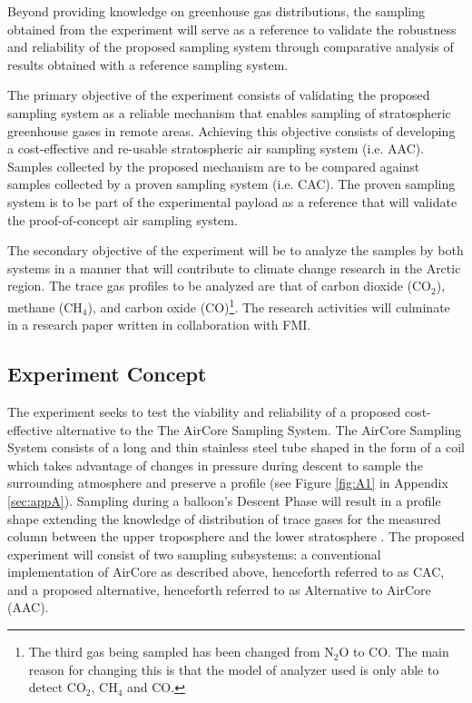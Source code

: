 \documentclass[a4paper,12pt,twoside]{article}
\begin{document}
Beyond providing knowledge on greenhouse gas distributions, the sampling obtained from the experiment will serve as a reference to validate the robustness and reliability of the proposed sampling system through comparative analysis of results obtained with a reference sampling system.

The primary objective of the experiment consists of validating the proposed sampling system as a reliable mechanism that enables sampling of stratospheric greenhouse gases in remote areas. Achieving this objective consists of developing a cost-effective and re-usable stratospheric air sampling system (i.e. AAC). Samples collected by the proposed mechanism are to be compared against samples collected by a proven sampling system (i.e. CAC). The proven sampling system is to be part of the experimental payload as a reference that will validate the proof-of-concept air sampling system.

The secondary objective of the experiment will be to analyze the samples by both systems in a manner that will contribute to climate change research in the Arctic region. The trace gas profiles to be analyzed are that of carbon dioxide (CO$_{2}$), methane (CH$_{4}$), and carbon oxide (CO)\footnote{The third gas being sampled has been changed from N$_{2}$O to CO. The main reason for changing this is that the model of analyzer used is only able to detect CO$_{2}$, CH$_{4}$ and CO.\label{fn:ChangeN2OtoCO}}. The research activities will culminate in a research paper written in collaboration with FMI.


\subsection{Experiment Concept}

The experiment seeks to test the viability and reliability of a proposed cost-effective alternative to the The AirCore Sampling System. The AirCore Sampling System consists of a long and thin stainless steel tube shaped in the form of a coil which takes advantage of changes in pressure during descent to sample the surrounding atmosphere and preserve a profile (see Figure \ref{fig:A1} in Appendix \ref{sec:appA}). Sampling during a balloon’s Descent Phase will result in a profile shape extending the knowledge of distribution of trace gases for the measured column between the upper troposphere and the lower stratosphere \cite{Karion}. The proposed experiment will consist of two sampling subsystems: a conventional implementation of AirCore as described above, henceforth referred to as CAC, and a proposed alternative, henceforth referred to as Alternative to AirCore (AAC).
\end{document}

